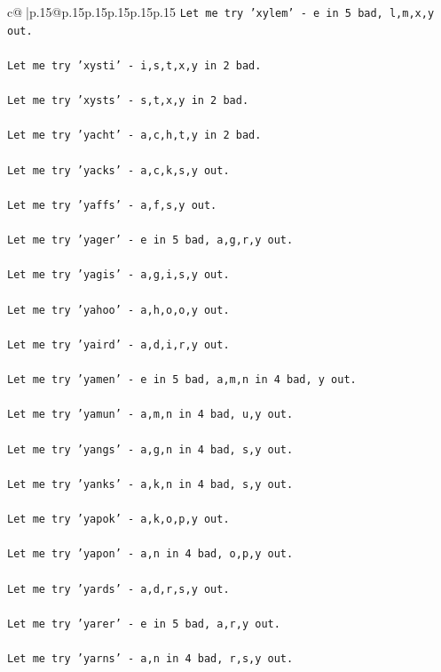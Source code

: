 \documentclass{article}
\begin{document}
{\begin{supertabular}{c@{$\;$}|p{.15\linewidth}@{}p{.15\linewidth}p{.15\linewidth}p{.15\linewidth}p{.15\linewidth}p{.15\linewidth}}
{{{\texttt{Let me try 'xylem' {-} e in 5 bad, l,m,x,y out. } \\
\\ 
\texttt{Let me try 'xysti' {-} i,s,t,x,y in 2 bad. } \\
\\ 
\texttt{Let me try 'xysts' {-} s,t,x,y in 2 bad. } \\
\\ 
\texttt{Let me try 'yacht' {-} a,c,h,t,y in 2 bad. } \\
\\ 
\texttt{Let me try 'yacks' {-} a,c,k,s,y out. } \\
\\ 
\texttt{Let me try 'yaffs' {-} a,f,s,y out. } \\
\\ 
\texttt{Let me try 'yager' {-} e in 5 bad, a,g,r,y out. } \\
\\ 
\texttt{Let me try 'yagis' {-} a,g,i,s,y out. } \\
\\ 
\texttt{Let me try 'yahoo' {-} a,h,o,o,y out. } \\
\\ 
\texttt{Let me try 'yaird' {-} a,d,i,r,y out. } \\
\\ 
\texttt{Let me try 'yamen' {-} e in 5 bad, a,m,n in 4 bad, y out. } \\
\\ 
\texttt{Let me try 'yamun' {-} a,m,n in 4 bad, u,y out. } \\
\\ 
\texttt{Let me try 'yangs' {-} a,g,n in 4 bad, s,y out. } \\
\\ 
\texttt{Let me try 'yanks' {-} a,k,n in 4 bad, s,y out. } \\
\\ 
\texttt{Let me try 'yapok' {-} a,k,o,p,y out. } \\
\\ 
\texttt{Let me try 'yapon' {-} a,n in 4 bad, o,p,y out. } \\
\\ 
\texttt{Let me try 'yards' {-} a,d,r,s,y out. } \\
\\ 
\texttt{Let me try 'yarer' {-} e in 5 bad, a,r,y out. } \\
\\ 
\texttt{Let me try 'yarns' {-} a,n in 4 bad, r,s,y out. } \\
}}}
\end{supertabular}}
\end{document}
